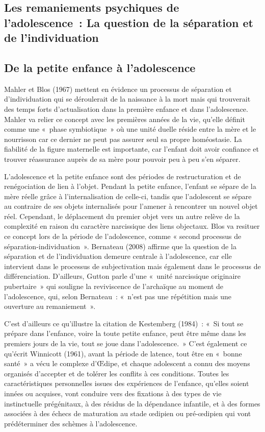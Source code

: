 \documentclass[12pt, a4paper]{book}
\begin{document}
\begin{spacing}{1.5}
\section{Les remaniements psychiques de l'adolescence : La question de la séparation et de l'individuation}

\subsection{De la petite enfance à l'adolescence}

Mahler et Blos (1967) mettent en évidence un processus de séparation et d'individuation qui se déroulerait de la naissance à la mort mais qui trouverait des temps forts d'actualisation dans la première enfance et dans l'adolescence. Mahler va relier ce concept avec les premières années de la vie, qu'elle définit comme une « phase symbiotique » où une unité duelle réside entre la mère et le nourrisson car ce dernier ne peut pas assurer seul sa propre homéostasie. La fiabilité de la figure maternelle est importante, car l'enfant doit avoir confiance et trouver réassurance auprès de sa mère pour pouvoir peu à peu s'en séparer. 

L'adolescence et la petite enfance sont des périodes de restructuration et de renégociation de lien à l'objet. Pendant la petite enfance, l'enfant se sépare de la mère réelle grâce à l'internalisation de celle-ci, tandis que l'adolescent se sépare au contraire de ses objets internalisés pour l'amener à rencontrer un nouvel objet réel. Cependant, le déplacement du premier objet vers un autre relève de la complexité en raison du caractère narcissique des liens objectaux. Blos va resituer ce concept lors de la période de l'adolescence, comme « second processus de séparation-individuation ». Bernateau (2008) affirme que la question de la séparation et de l'individuation demeure centrale à l'adolescence, car elle intervient dans le processus de subjectivation mais également dans le processus de différenciation. D'ailleurs, Gutton parle d'une « unité narcissique originaire pubertaire » qui souligne la reviviscence de l'archaïque au moment de l'adolescence, qui, selon Bernateau : « n'est pas une répétition mais une ouverture au remaniement ». 

C'est d'ailleurs ce qu'illustre la citation de Kestemberg (1984) : « Si tout se prépare dans l'enfance, voire la toute petite enfance, peut être même dans les premiers jours de la vie, tout se joue dans l'adolescence. » C'est également ce qu'écrit Winnicott (1961), avant la période de latence, tout être en « bonne santé » a vécu le complexe d'Œdipe, et chaque adolescent a connu des moyens organisés d'accepter et de tolérer les conflits à ces conditions. Toutes les caractéristiques personnelles issues des expériences de l'enfance, qu'elles soient innées ou acquises, vont conduire vers des fixations à des types de vie instinctuelle prégénitaux, à des résidus de la dépendance infantile, et à des formes associées à des échecs de maturation au stade œdipien ou pré-œdipien qui vont prédéterminer des schèmes à l'adolescence. 


\end{spacing}
\end{document}
